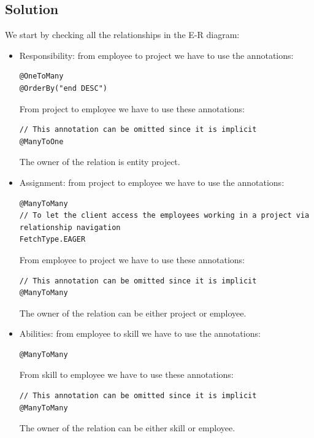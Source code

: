 \documentclass[12pt, a4paper]{report}
\begin{document}
        \subsection*{Solution}
            We start by checking all the relationships in the E-R diagram: 
            \begin{itemize}
                \item Responsibility: from employee to project we have to use the annotations: 
                    \begin{lstlisting}[style=Java]
@OneToMany
@OrderBy("end DESC")
                    \end{lstlisting}
                    From project to employee we have to use these annotations: 
                    \begin{lstlisting}[style=Java]
// This annotation can be omitted since it is implicit
@ManyToOne
                    \end{lstlisting}
                    The owner of the relation is entity project. 
                \item Assignment: from project to employee we have to use the annotations: 
                    \begin{lstlisting}[style=Java]
@ManyToMany
// To let the client access the employees working in a project via relationship navigation
FetchType.EAGER
                    \end{lstlisting}
                    From employee to project we have to use these annotations: 
                    \begin{lstlisting}[style=Java]
// This annotation can be omitted since it is implicit
@ManyToMany
                    \end{lstlisting}
                    The owner of the relation can be either project or employee. 
                \item Abilities: from employee to skill we have to use the annotations: 
                    \begin{lstlisting}[style=Java]
@ManyToMany
                    \end{lstlisting}
                    From skill to employee we have to use these annotations: 
                    \begin{lstlisting}[style=Java]
// This annotation can be omitted since it is implicit
@ManyToMany
                    \end{lstlisting}
                    The owner of the relation can be either skill or employee. 
            \end{itemize}
\end{document}
